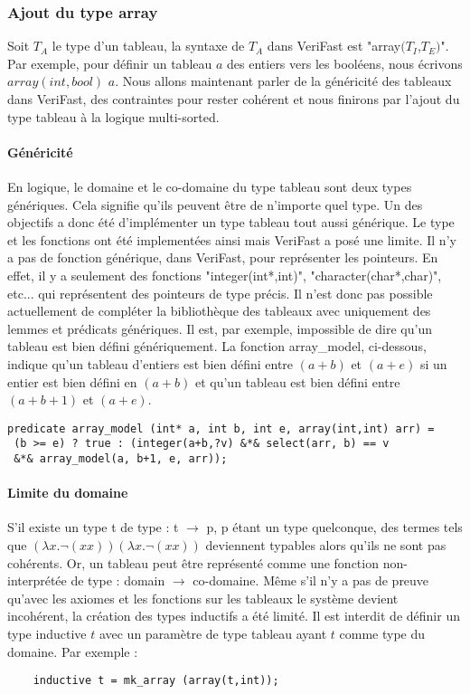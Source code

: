\documentclass[11pt,openany]{article}
\newcommand{\verifast}{VeriFast}
\begin{document}
		\subsubsection{Ajout du type array}
		Soit $T_{A}$ le type d'un tableau, la syntaxe de $T_{A}$ dans \verifast{} est "array$(T_I$,$T_E)$". Par exemple, pour d\'efinir un tableau $a$ des entiers vers les bool\'eens, nous \'ecrivons $array(int,bool)$ $a$. Nous allons maintenant parler de la g\'en\'ericit\'e des tableaux dans \verifast{}, des contraintes pour rester coh\'erent et nous finirons par l'ajout du type tableau \`a la logique multi-sorted.
			\paragraph{G\'en\'ericit\'e}
			En logique, le domaine et le co-domaine du type tableau sont deux types g\'en\'eriques. Cela signifie qu'ils peuvent \^etre de n'importe quel type. Un des objectifs a donc \'et\'e d'impl\'ementer un type tableau tout aussi g\'en\'erique. Le type et les fonctions ont \'et\'e implement\'ees ainsi mais \verifast{} a pos\'e une limite. Il n'y a pas de fonction g\'en\'erique, dans \verifast, pour repr\'esenter les pointeurs. En effet, il y a seulement des fonctions "integer(int*,int)", "character(char*,char)", etc... qui repr\'esentent des pointeurs de type pr\'ecis. Il n'est donc pas possible actuellement de compl\'eter la biblioth\`eque des tableaux avec uniquement des lemmes et pr\'edicats g\'en\'eriques. Il est, par exemple, impossible de dire qu'un tableau est bien d\'efini g\'en\'eriquement. La fonction array\_model, ci-dessous, indique qu'un tableau d'entiers est bien d\'efini entre $(a+b)$ et $(a+e)$ si un entier est bien d\'efini en $(a+b)$ et qu'un tableau est bien d\'efini entre $(a+b+1)$ et $(a+e)$.
\begin{lstlisting}
predicate array_model (int* a, int b, int e, array(int,int) arr) =
 (b >= e) ? true : (integer(a+b,?v) &*& select(arr, b) == v
 &*& array_model(a, b+1, e, arr));
\end{lstlisting}
			\paragraph{Limite du domaine}
			S'il existe un type t de type : t $\rightarrow$ p, p \'etant un type quelconque, des termes tels que $(\lambda x. \neg(xx))(\lambda x.\neg(xx))$ 	deviennent typables alors qu'ils ne sont pas coh\'erents. Or, un tableau peut \^etre repr\'esent\'e comme une fonction non-interpr\'et\'ee de type : domain $\rightarrow$ co-domaine. M\^eme s'il n'y a pas de preuve qu'avec les axiomes et les fonctions sur les tableaux le syst\`eme devient incoh\'erent, la cr\'eation des types inductifs a \'et\'e limit\'e. Il est interdit de d\'efinir un type inductive $t$ avec un param\`etre de type tableau ayant $t$ comme type du domaine. Par exemple :
			\begin{lstlisting}			
    inductive t = mk_array (array(t,int));
			\end{lstlisting}
\end{document}
